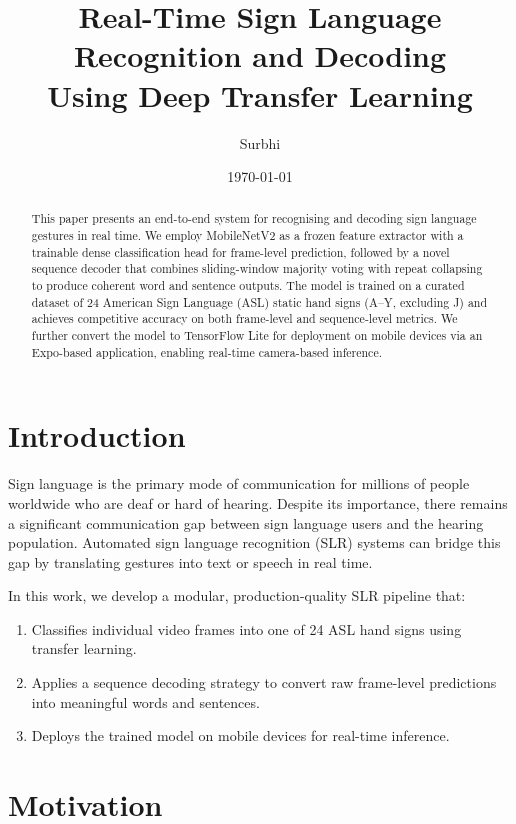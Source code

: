\documentclass[12pt, a4paper]{article}
\title{Real-Time Sign Language Recognition and Decoding \\Using Deep Transfer Learning}
\author{Surbhi}
\date{\today}
\begin{document}
\maketitle

\begin{abstract}
This paper presents an end-to-end system for recognising and decoding sign language gestures in real time. We employ MobileNetV2 as a frozen feature extractor with a trainable dense classification head for frame-level prediction, followed by a novel sequence decoder that combines sliding-window majority voting with repeat collapsing to produce coherent word and sentence outputs. The model is trained on a curated dataset of 24 American Sign Language (ASL) static hand signs (A--Y, excluding J) and achieves competitive accuracy on both frame-level and sequence-level metrics. We further convert the model to TensorFlow Lite for deployment on mobile devices via an Expo-based application, enabling real-time camera-based inference.
\end{abstract}

\section{Introduction}

Sign language is the primary mode of communication for millions of people worldwide who are deaf or hard of hearing. Despite its importance, there remains a significant communication gap between sign language users and the hearing population. Automated sign language recognition (SLR) systems can bridge this gap by translating gestures into text or speech in real time.

In this work, we develop a modular, production-quality SLR pipeline that:
\begin{enumerate}
    \item Classifies individual video frames into one of 24 ASL hand signs using transfer learning.
    \item Applies a sequence decoding strategy to convert raw frame-level predictions into meaningful words and sentences.
    \item Deploys the trained model on mobile devices for real-time inference.
\end{enumerate}

\section{Motivation}
\end{document}
